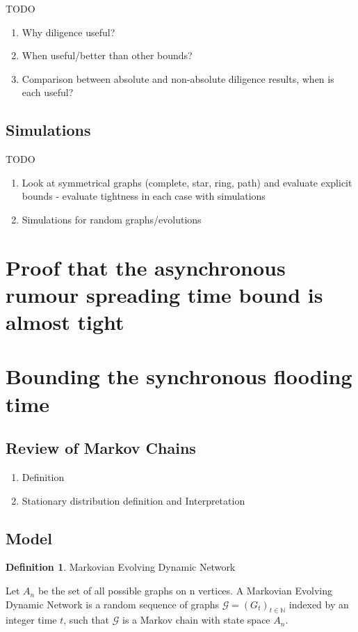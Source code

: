 \documentclass[a4paper,11pt]{article}
\theoremstyle{definition}
\newtheorem{definition}[theorem]{Definition}
\begin{document}
TODO

\begin{enumerate}
	\item Why diligence useful?
	\item When useful/better than other bounds?
	\item Comparison between absolute and non-absolute  diligence results, when is each useful?
\end{enumerate}

\subsection{Simulations}

TODO 

\begin{enumerate}
	\item Look at symmetrical graphs (complete, star, ring, path) and evaluate explicit bounds - evaluate tightness in each case with simulations
	\item Simulations for random graphs/evolutions
\end{enumerate}

\section{Proof that the asynchronous rumour spreading time bound is almost tight}
\label{AsyncLowerBoundSection}

\section{Bounding the synchronous flooding time}
\label{SyncFloodingSection}

\subsection{Review of Markov Chains}

\begin{enumerate}
	\item Definition
	\item Stationary distribution definition and Interpretation
\end{enumerate}

\subsection{Model}

\begin{definition}
	Markovian Evolving Dynamic Network

	\noindent 
	Let $A_n$ be the set of all possible graphs on n vertices.
	A Markovian Evolving Dynamic Network is a random sequence of graphs $\mathcal{G} = (G_t)_{t \in \mathbb{N}}$ indexed by an integer time $t$, such that $\mathcal{G}$ is a Markov chain with state space $A_n$.
\end{definition}
\end{document}
